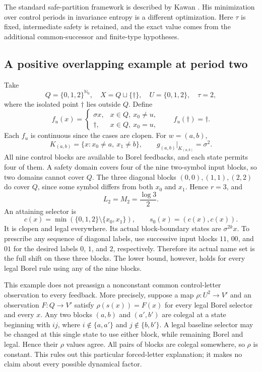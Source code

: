 \documentclass[11pt,reqno]{amsart}
\numberwithin{equation}{section}
\theoremstyle{definition}
\newcommand{\Nzero}{\mathbb N_0}
\begin{document}
The standard safe-partition framework is described by Kawan
\cite[Chapter~2]{Kawan2013}. His minimization over control periods in
invariance entropy is a different optimization. Here $\tau$ is fixed,
intermediate safety is retained, and the exact value comes from the
additional common-successor and finite-type hypotheses.

\subsection{A positive overlapping example at period two}

Take
\[
 Q=\{0,1,2\}^{\Nzero},\quad X=Q\sqcup\{\dagger\},\quad
 U=\{0,1,2\},\quad\tau=2,
\]
where the isolated point $\dagger$ lies outside $Q$. Define
\[
 f_u(x)=
 \begin{cases}\sigma x,&x\in Q,\ x_0\ne u,\\
 \dagger,&x\in Q,\ x_0=u,\end{cases}
 \qquad f_u(\dagger)=\dagger.
\]
Each $f_u$ is continuous since the cases are clopen. For $w=(a,b)$,
\[
 K_{(a,b)}=\{x:x_0\ne a,\ x_1\ne b\},\qquad
 g_{(a,b)}|_{K_{(a,b)}}=\sigma^2.
\]
All nine control blocks are available to Borel feedbacks, and each
state permits four of them. A safety domain covers four of the nine
two-symbol input blocks, so two domains cannot cover $Q$. The three
diagonal blocks $(0,0),(1,1),(2,2)$ do cover $Q$, since some symbol
differs from both $x_0$ and $x_1$. Hence $r=3$, and
\[
 L_2=M_2=\frac{\log3}{2}.
\]
An attaining selector is
\[
 c(x)=\min(\{0,1,2\}\setminus\{x_0,x_1\}),\qquad
 s_0(x)=(c(x),c(x)).
\]
It is clopen and legal everywhere. Its actual block-boundary states
are $\sigma^{2k}x$. To prescribe any sequence of diagonal labels, use
successive input blocks $11$, $00$, and $01$ for the desired labels
$0$, $1$, and $2$, respectively. Therefore its actual name set is the
full shift on these three blocks. The lower bound, however, holds for
every legal Borel rule using any of the nine blocks.

This example does not preassign a nonconstant common control-letter
observation to every feedback. More precisely, suppose a map
$\rho:U^2\to V'$ and an observation $F:Q\to V'$ satisfy
$\rho(s(x))=F(x)$ for every legal Borel selector and every $x$.
Any two blocks $(a,b)$ and $(a',b')$ are colegal at a state beginning
with $ij$, where $i\notin\{a,a'\}$ and $j\notin\{b,b'\}$.
A legal baseline selector may be changed at this single state to use
either block, while remaining Borel and legal. Hence their $\rho$
values agree. All pairs of blocks are colegal somewhere, so $\rho$
is constant. This rules out this particular forced-letter explanation;
it makes no claim about every possible dynamical factor.
\end{document}
